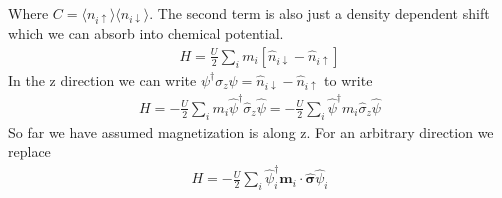 \documentclass[11pt]{article}
\begin{document}
Where $C = \langle n_{i\uparrow}\rangle\langle n_{i\downarrow}\rangle$. The second term is also just a density dependent shift which we can absorb into chemical potential.
\begin{gather}
    H=\frac{U}{2}\sum_i m_i\left[\hat n_{i\downarrow} - \hat n_{i\uparrow}\right]
\end{gather}
In the z direction we can write $\psi^\dagger \sigma_z\psi = \hat n_{i\downarrow} - \hat n_{i\uparrow}$ to write
\begin{gather}
    H=-\frac{U}{2}\sum_im_i\hat\psi^\dagger \hat\sigma_z \hat\psi = -\frac{U}{2}\sum_i\hat\psi^\dagger m_i\hat\sigma_z \hat\psi
\end{gather}
So far we have assumed magnetization is along z. For an arbitrary direction we replace
\begin{gather}
    H=-\frac{U}{2}\sum_i \hat \psi_i^\dagger \bm m_i\cdot \bm{\hat \sigma} \hat \psi_i 
\end{gather}
\end{document}
